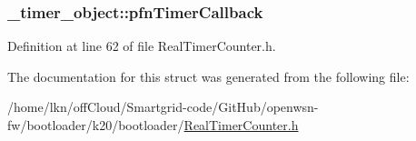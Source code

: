 \subsubsection[{\texorpdfstring{pfn\+Timer\+Callback}{pfnTimerCallback}}]{ \+\_\+timer\+\_\+object\+::pfn\+Timer\+Callback}\hypertarget{struct__timer__object_a32dd3c990468be61b1959f1f7a2ad778}{}\label{struct__timer__object_a32dd3c990468be61b1959f1f7a2ad778}


Definition at line 62 of file Real\+Timer\+Counter.\+h.



The documentation for this struct was generated from the following file\+:\begin{DoxyCompactItemize}
\item 
/home/lkn/off\+Cloud/\+Smartgrid-\/code/\+Git\+Hub/openwsn-\/fw/bootloader/k20/bootloader/\hyperlink{_real_timer_counter_8h}{Real\+Timer\+Counter.\+h}\end{DoxyCompactItemize}

